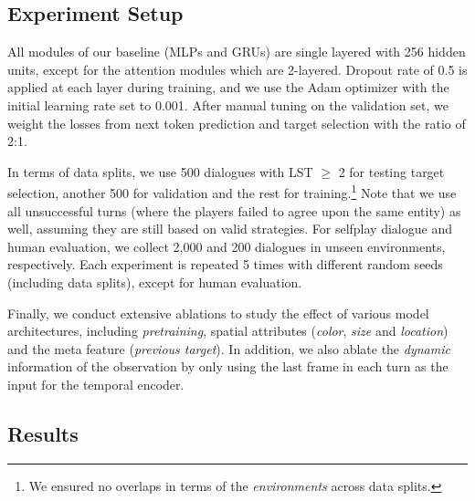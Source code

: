 \subsection{Experiment Setup}
\label{06_subsec:experiment_setup}

All modules of our baseline (MLPs and GRUs) are single layered with 256 hidden units, except for the attention modules which are 2-layered. Dropout rate of 0.5 is applied at each layer during training, and we use the Adam optimizer \citep{Kingma2015AdamAM} with the initial learning rate set to 0.001. After manual tuning on the validation set, we weight the losses from next token prediction and target selection with the ratio of 2:1.

In terms of data splits, we use 500 dialogues with LST $\geq$ 2 for testing target selection, another 500 for validation and the rest for training.\footnote{We ensured no overlaps in terms of the \textit{environments} across data splits.} Note that we use all unsuccessful turns (where the players failed to agree upon the same entity) as well, assuming they are still based on valid strategies. For selfplay dialogue and human evaluation, we collect 2,000 and 200 dialogues in unseen environments, respectively. Each experiment is repeated 5 times with different random seeds (including data splits), except for human evaluation.

Finally, we conduct extensive ablations to study the effect of various model architectures, including \textit{pretraining}, spatial attributes (\textit{color}, \textit{size} and \textit{location}) and the meta feature (\textit{previous target}). In addition, we also ablate the \textit{dynamic} information of the observation by only using the last frame in each turn as the input for the temporal encoder.

\subsection{Results}
\label{06_subsec:results}


